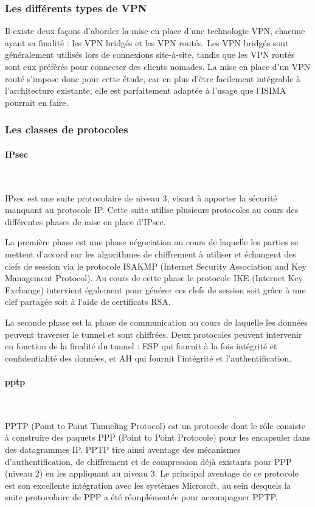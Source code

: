 \subsubsection{Les différents types de VPN}

Il existe deux façons d'aborder la mise en place d'une technologie VPN, chacune ayant sa finalité : les VPN bridgés et les VPN routés. Les VPN bridgés sont généralement utilisés lors de connexions site-à-site, tandis que les VPN routés sont eux préférés pour connecter des clients nomades. La mise en place d'un VPN routé s'impose donc pour cette étude, car en plus d'être facilement intégrable à l'architecture existante, elle est parfaitement adaptée à l'usage que l'ISIMA pourrait en faire.

\subsubsection{Les classes de protocoles}
\paragraph{IPsec}
~

IPsec est une suite protocolaire de niveau 3, visant à apporter la sécurité manquant au protocole IP. Cette suite utilise plusieurs protocoles au cours des différentes phases de mise en place d'IPsec.

La première phase est une phase négociation au cours de laquelle les parties se mettent d'accord sur les algorithmes de chiffrement à utiliser et échangent des clefs de session via le protocole ISAKMP (Internet Security Association and Key Management Protocol). Au cours de cette phase le protocole IKE (Internet Key Exchange) intervient également pour générer ces clefs de session soit grâce à une clef partagée soit à l'aide de certificats RSA.

La seconde phase est la phase de communication au cours de laquelle les données peuvent traverser le tunnel et sont chiffrées. Deux protocoles peuvent intervenir en fonction de la finalité du tunnel : ESP qui fournit à la fois intégrité et confidentialité des données, et AH qui fournit l'intégrité et l'authentification.


\paragraph{pptp}
~

PPTP (Point to Point Tunneling Protocol) est un protocole dont le rôle consiste à construire des paquets PPP (Point to Point Protocole) pour les encapsuler dans des datagrammes IP. PPTP tire ainsi aventage des mécanismes d'authentification, de chiffrement et de compression déjà existants pour PPP (niveau 2) en les appliquant au niveau 3. Le principal aventage de ce protocole est son excellente intégration avec les systèmes Microsoft, au sein desquels la suite protocolaire de PPP a été réimplémentée pour accompagner PPTP.

